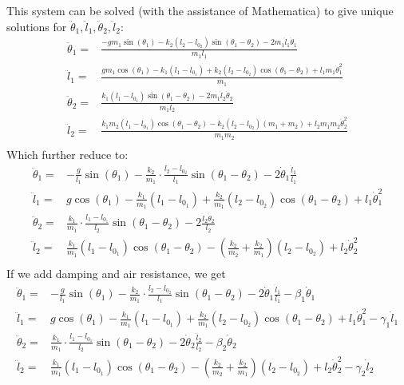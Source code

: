 \documentclass[12pt]{article}
\newenvironment{problem}[2][Problem]
{
	\begin{trivlist} 
		\item[\hskip \labelsep {\bfseries #1 #2:}]
	}
{
	\end{trivlist}
	}
\begin{document}
\begin{problem}{1}
This system can be solved (with the assistance of Mathematica) to give unique solutions for $\ddot{\theta}_1, \ddot{l}_1, \ddot{\theta}_2,\ddot{l}_2$:
\begin{align*}
\ddot{\theta}_1 =&\frac{-g m_1 \sin(\theta_1) - k_2 (l_2-l_{0_2}) \sin(\theta_1 - \theta_2) - 2 m_1 \dot{l}_1 \dot{\theta}_1}{m_1 l_1}\\
%
\ddot{l}_1 =& \frac{g m_1 \cos(\theta_1) - k_1(l_1- l_{0_1}) +k_2 (l_2-l_{0_2}) \cos(\theta_1 - \theta_2) + l_1 m_1 \dot{\theta}_1 ^2}{m_1}\\
%
\ddot{\theta}_2 =& \frac{k_1 (l_1-l_{0_1}) \sin(\theta_1 -\theta_2) - 2 m_1 \dot{l}_2 \dot{\theta}_2}{m_1 l_2}\\
%
\ddot{l}_2 =& \frac{k_1 m_2 (l_1-l_{0_1}) \cos(\theta_1 - \theta_2) -k_2(l_2 - l_{0_2}) (m_1+m_2) + l_2 m_1 m_2 \dot{\theta}_2 ^2}{m_1 m_2}\\
\end{align*}
Which further reduce to:
\begin{align*}
\ddot{\theta}_1 =& -\frac{g}{l_1} \sin(\theta_1) - \frac{k_2}{m_1} \cdot \frac{l_2-l_{0_2}}{l_1} \sin(\theta_1 - \theta_2) - 2 \dot{\theta}_1 \frac{\dot{l}_1}{l_1}\\
%
\ddot{l}_1 =& g \cos(\theta_1) - \frac{k_1}{m_1}(l_1- l_{0_1}) + \frac{k_2}{m_1} (l_2-l_{0_2}) \cos(\theta_1 - \theta_2) + l_1 \dot{\theta}_1 ^2\\
%
\ddot{\theta}_2 =& \frac{k_1}{m_1}\cdot \frac{l_1-l_{0_1}}{l_2} \sin(\theta_1 -\theta_2) - 2 \frac{\dot{l}_2 \dot{\theta}_2}{l_2}\\
%
\ddot{l}_2 =& \frac{k_1}{m_1} (l_1-l_{0_1}) \cos(\theta_1 - \theta_2) -(\frac{k_2}{m_2} +\frac{k_2}{m_1})(l_2 - l_{0_2}) + l_2 \dot{\theta}_2 ^2\\
\end{align*}
If we add damping and air resistance, we get
\begin{align*}
\ddot{\theta}_1 =& -\frac{g}{l_1} \sin(\theta_1) - \frac{k_2}{m_1} \cdot \frac{l_2-l_{0_2}}{l_1} \sin(\theta_1 - \theta_2) - 2 \dot{\theta}_1 \frac{\dot{l}_1}{l_1} - \beta_1 \dot{\theta}_1\\
%
\ddot{l}_1 =& g \cos(\theta_1) - \frac{k_1}{m_1}(l_1- l_{0_1}) + \frac{k_2}{m_1} (l_2-l_{0_2}) \cos(\theta_1 - \theta_2) + l_1 \dot{\theta}_1 ^2 - \gamma_1 \dot{l}_1\\
%
\ddot{\theta}_2 =& \frac{k_1}{m_1}\cdot \frac{l_1-l_{0_1}}{l_2} \sin(\theta_1 -\theta_2) - 2 \dot{\theta}_2 \frac{\dot{l}_2}{l_2} - \beta_2 \dot{\theta}_2\\
%
\ddot{l}_2 =& \frac{k_1}{m_1} (l_1-l_{0_1}) \cos(\theta_1 - \theta_2) -(\frac{k_2}{m_2} +\frac{k_2}{m_1})(l_2 - l_{0_2}) + l_2 \dot{\theta}_2 ^2 - \gamma_2 \dot{l}_2\\

\end{align*}
\end{problem}
\end{document}
